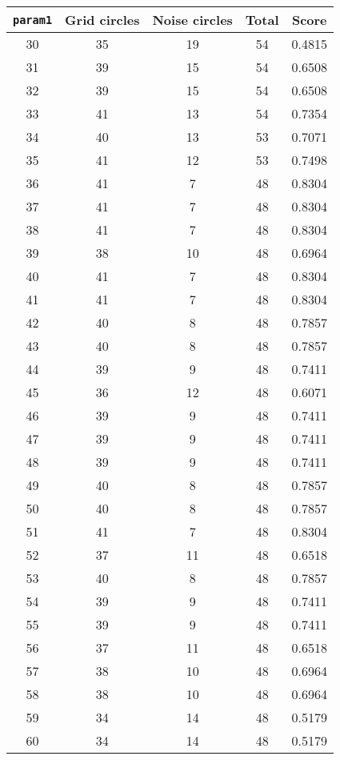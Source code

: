 \documentclass[letterpaper, 12pt]{article}
\begin{document}
\begin{longtable}{|c|c|c|c|c|}
\hline
\textbf{\texttt{param1}} & \textbf{Grid circles} & \textbf{Noise circles} & \textbf{Total} & \textbf{Score} \\
\hline
30 & 35 & 19 & 54 & 0.4815 \\
\hline
31 & 39 & 15 & 54 & 0.6508 \\
\hline
32 & 39 & 15 & 54 & 0.6508 \\
\hline
33 & 41 & 13 & 54 & 0.7354 \\
\hline
34 & 40 & 13 & 53 & 0.7071 \\
\hline
35 & 41 & 12 & 53 & 0.7498 \\
\hline
36 & 41 & 7 & 48 & 0.8304 \\
\hline
37 & 41 & 7 & 48 & 0.8304 \\
\hline
38 & 41 & 7 & 48 & 0.8304 \\
\hline
39 & 38 & 10 & 48 & 0.6964 \\
\hline
40 & 41 & 7 & 48 & 0.8304 \\
\hline
41 & 41 & 7 & 48 & 0.8304 \\
\hline
42 & 40 & 8 & 48 & 0.7857 \\
\hline
43 & 40 & 8 & 48 & 0.7857 \\
\hline
44 & 39 & 9 & 48 & 0.7411 \\
\hline
45 & 36 & 12 & 48 & 0.6071 \\
\hline
46 & 39 & 9 & 48 & 0.7411 \\
\hline
47 & 39 & 9 & 48 & 0.7411 \\
\hline
48 & 39 & 9 & 48 & 0.7411 \\
\hline
49 & 40 & 8 & 48 & 0.7857 \\
\hline
50 & 40 & 8 & 48 & 0.7857 \\
\hline
51 & 41 & 7 & 48 & 0.8304 \\
\hline
52 & 37 & 11 & 48 & 0.6518 \\
\hline
53 & 40 & 8 & 48 & 0.7857 \\
\hline
54 & 39 & 9 & 48 & 0.7411 \\
\hline
55 & 39 & 9 & 48 & 0.7411 \\
\hline
56 & 37 & 11 & 48 & 0.6518 \\
\hline
57 & 38 & 10 & 48 & 0.6964 \\
\hline
58 & 38 & 10 & 48 & 0.6964 \\
\hline
59 & 34 & 14 & 48 & 0.5179 \\
\hline
60 & 34 & 14 & 48 & 0.5179 \\
\hline

\end{longtable}
\end{document}

